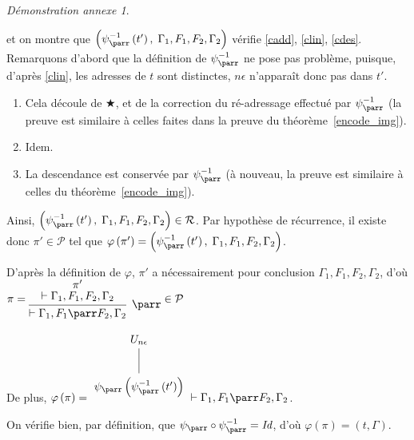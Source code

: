 \documentclass[11pt,a4paper]{article}
\theoremstyle{plain}
\theoremstyle{definition}
\theoremstyle{remark}
\newtheorem{demonstrationappendix}{Démonstration annexe}
\newcommand*{\namedproofv}[2]{\hypo{#1}\infer[no rule]{1}{\vdash #2}}
\newcommand*{\parrv}[1]{\infer{1}[\ensuremath{\parr}]{\vdash #1}}
\newcommand*{\sequent}{\Gamma}
\newcommand*{\proofs}{\ensuremath{\mathcal{P}}}
\newcommand*{\representations}{\ensuremath{\mathcal{R}}}
\newcommand*{\encode}{\ensuremath{\varphi}}
\begin{document}
\begin{demonstrationappendix}
\begin{description}
        et on montre que $\left( \psi_\parr^{-1} \left( t' \right), \; \sequent_1, F_1, F_2, \sequent_2 \right)$ vérifie \ref{cadd}, \ref{clin}, \ref{cdes}. Remarquons d'abord que la définition de $\psi_\parr^{-1}$ ne pose pas problème, puisque, d'après \ref{clin}, les adresses de $t$ sont distinctes, $n \epsilon$ n'apparaît donc pas dans $t'$.
    
        \begin{enumerate}
            \item Cela découle de $\bigstar$, et de la correction du ré-adressage effectué par $\psi_\parr^{-1}$ (la preuve est similaire à celles faites dans la preuve du théorème~\ref{encode_img}).
    
            \item Idem.
    
            \item La descendance est conservée par $\psi_\parr^{-1}$ (à nouveau, la preuve est similaire à celles du théorème~\ref{encode_img}).
        \end{enumerate}
    
        Ainsi, $\left( \psi_\parr^{-1} \left( t' \right), \; \sequent_1, F_1, F_2, \sequent_2 \right) \in \representations$. Par hypothèse de récurrence, il existe donc $\pi' \in \proofs$ tel que $\encode \left( \pi' \right) = \left( \psi_\parr^{-1} \left( t' \right), \; \sequent_1, F_1, F_2, \sequent_2 \right)$.
        
        D'après la définition de $\encode$, $\pi'$ a nécessairement pour conclusion $\sequent_1, F_1, F_2, \sequent_2$, d'où
        $\pi = 
        \begin{prooftree}
            \namedproofv{\pi'}{\sequent_1, F_1, F_2, \sequent_2}
            \parrv{\sequent_1, F_1 \parr F_2, \sequent_2}
        \end{prooftree} 
        \in \proofs$
    
        De plus, $\encode \left( \pi \right) = 
        \begin{tikzpicture}%
        [level 2/.style={sibling distance=3.5cm}]
        \node {$U_{n \epsilon}$}
            child {node {$\psi_\parr \left( \psi_\parr^{-1} \left(
               t' \right) \right)$}
        };
        \end{tikzpicture} \vdash \sequent_1, F_1 \parr F_2, \sequent_2$.
    
        On vérifie bien, par définition, que $\psi_\parr \circ \psi_\parr^{-1} = \textit{Id}$, d'où $\encode \left( \pi \right) = (t, \sequent)$.
    

\end{description}
\end{demonstrationappendix}
\end{document}
